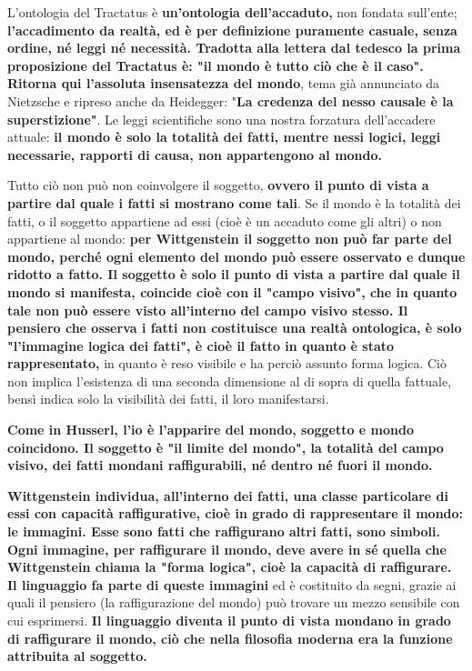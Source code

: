 L'ontologia del Tractatus è \textbf{un'ontologia dell'accaduto,}
non fondata sull'ente; \textbf{l'accadimento da realtà, ed è
per definizione puramente casuale, senza ordine, né
leggi né necessità. Tradotta alla lettera dal tedesco la prima
proposizione del Tractatus è: "il mondo è tutto ciò
che è il caso".
Ritorna qui l'assoluta insensatezza del mondo}, tema
già annunciato da Nietzsche e ripreso anche
da Heidegger: "\textbf{La credenza del nesso causale è la
superstizione"}. Le leggi scientifiche sono una nostra
forzatura dell'accadere attuale: \textbf{il mondo è solo
la totalità dei fatti, mentre nessi logici, leggi
necessarie, rapporti di causa, non appartengono al
mondo.}

Tutto ciò non può non coinvolgere il soggetto, \textbf{ovvero
il punto di vista a partire dal quale i fatti si mostrano
come tali}. Se il mondo è la totalità dei fatti,
o il soggetto appartiene ad essi (cioè è un accaduto
come gli altri) o non appartiene al mondo: \textbf{per Wittgenstein
il soggetto non può far parte del mondo, perché
ogni elemento del mondo può essere osservato e
dunque ridotto a fatto. Il soggetto è solo il punto di
vista a partire dal quale il mondo si manifesta,
coincide cioè con il "campo visivo", che in quanto
tale non può essere visto all'interno del campo
visivo stesso. Il pensiero che osserva i fatti non
costituisce una realtà ontologica, è solo
"l'immagine logica dei fatti", è cioè il fatto
in quanto è stato rappresentato,} in quanto è reso
visibile e ha perciò assunto forma logica. Ciò non
implica l'esistenza di una seconda dimensione
al di sopra di quella fattuale, bensì indica solo
la visibilità dei fatti, il loro manifestarsi.

\textbf{Come in Husserl, l'io è l'apparire del mondo,
soggetto e mondo coincidono.
Il soggetto è "il limite del mondo", la totalità del
campo visivo, dei fatti mondani raffigurabili, né
dentro né fuori il mondo.}

\textbf{Wittgenstein individua, all'interno dei fatti, una
classe particolare di essi con capacità raffigurative,
cioè in grado di rappresentare il mondo: le immagini.
Esse sono fatti che raffigurano altri fatti, sono
simboli. Ogni immagine, per raffigurare il mondo,
deve avere in sé quella che Wittgenstein chiama
la "forma logica", cioè la capacità di raffigurare.
Il linguaggio fa parte di queste immagini} ed è
costituito da segni, grazie ai quali il pensiero
(la raffigurazione del mondo) può trovare un
mezzo sensibile con cui esprimersi. \textbf{Il linguaggio
diventa il punto di vista mondano in grado di
raffigurare il mondo, ciò che nella filosofia
moderna era la funzione attribuita al soggetto.}

